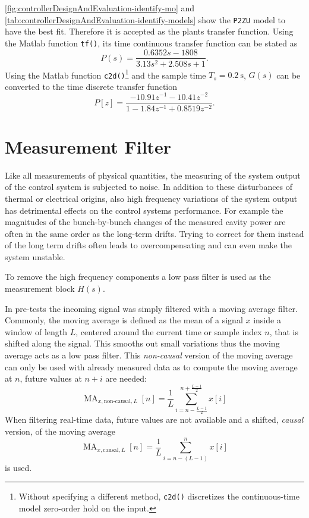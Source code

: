 \autoref{fig:controllerDesignAndEvaluation-identify-mo} and \autoref{tab:controllerDesignAndEvaluation-identify-models} show the \texttt{P2ZU} model to have the best fit. Therefore it is accepted as the plants transfer function. Using the Matlab function \texttt{tf()}, its time continuous transfer function can be stated as
\begin{equation}
P(s) = \frac{0.6352s - 1808}{3.13 s^2 + 2.508 s + 1}.
\end{equation}
Using the Matlab function \texttt{c2d()}\footnote{Without specifying a different method, \texttt{c2d()}  discretizes the continuous-time model zero-order hold on the input.} and the sample time $T_s=\SI{0.2}{\second}$, $G(s)$ can be converted to the time discrete transfer function
\begin{equation}
P[z] = \frac{-10.91 z^{-1} - 10.41 z^{-2}}{1 - 1.84 z^{-1} + 0.8519 z^{-2}}.
\end{equation}










\newpage
\section{Measurement Filter}
Like all measurements of physical quantities, the measuring of the system output of the control system is subjected to noise.
In addition to these disturbances of thermal or electrical origins, also high frequency variations of the system output has detrimental effects on the control systems performance.
For example the magnitudes of the bunch-by-bunch changes of the measured cavity power are often in the same order as the long-term drifts.
Trying to correct for them instead of the long term drifts often leads to overcompensating and can even make the system unstable.

To remove the high frequency components a low pass filter is used as the measurement block $H(s)$.

In pre-tests the incoming signal was simply filtered with a moving average filter.
Commonly, the moving average is defined as the mean of a signal $x$ inside a window of length $L$, centered around the current time or sample index $n$, that is shifted along the signal. This smooths out small variations thus the moving average acts as a low pass filter.
This \textit{non-causal} version of the moving average can only be used with already measured data as to compute the moving average at $n$, future values at $n+i$ are needed:
\begin{equation}
\operatorname{MA}_{x,\text{non-causal},L}[n] = \frac{1}{L} \sum_{i=n-\frac{L-1}{2}}^{n+\frac{L-1}{2}} x[i]
\end{equation}
When filtering real-time data, future values are not available and a shifted, \textit{causal} version, of the moving average
\begin{equation}\label{eq:causalMA}
\operatorname{MA}_{x,\text{causal},L}[n] = \frac{1}{L} \sum_{i=n-(L-1)}^{n} x[i]
\end{equation}
is used.

